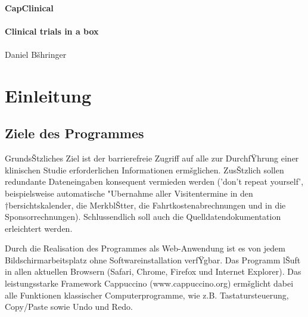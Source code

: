 \documentclass[11pt,oneside]{scrbook}
\begin{document}
{
\centering

~\\ 

{\noindent \huge \bf CapClinical \\~\\}
{\noindent \large \bf Clinical trials in a box\\~\\}
{\noindent   Daniel Bšhringer}

}
\tableofcontents
\newpage

\chapter{Einleitung}
\section{Ziele  des Programmes}
GrundsŠtzliches Ziel ist der barrierefreie Zugriff auf alle zur DurchfŸhrung einer klinischen Studie erforderlichen Informationen ermšglichen. ZusŠtzlich sollen redundante Dateneingaben konsequent vermieden werden ('don't repeat yourself', beispielsweise automatische "Ubernahme aller Visitentermine in den †bersichtskalender, die MerkblŠtter, die Fahrtkostenabrechnungen und in die Sponsorrechnungen). Schlussendlich  soll auch die Quelldatendokumentation erleichtert werden.


Durch die Realisation des Programmes als Web-Anwendung ist es von jedem Bildschirmarbeitsplatz  ohne Softwareinstallation verfŸgbar. Das Programm lŠuft in allen aktuellen Browsern (Safari, Chrome, Firefox und Internet Explorer).
Das leistungsstarke Framework Cappuccino (www.cappuccino.org) ermšglicht dabei alle Funktionen  klassischer Computerprogramme, wie z.B. Tastatursteuerung, Copy/Paste sowie Undo und Redo.
\end{document}

